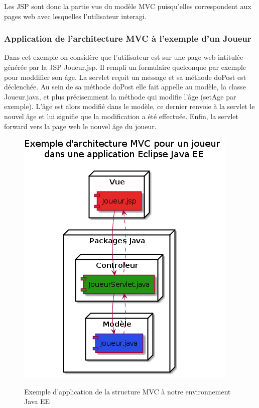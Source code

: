 Les JSP sont donc la partie vue du modèle MVC puisqu'elles correspondent aux pages web avec lesquelles l'utilisateur interagi.

\subsubsection{Application de l'architecture MVC à l'exemple d'un Joueur}
Dans cet exemple on considère que l'utilisateur est sur une page web intitulée générée par la JSP Joueur.jsp. Il rempli un formulaire quelconque par exemple pour moddifier son âge. La servlet reçoit un message et sa méthode doPost est déclenchée. Au sein de sa méthode doPost elle fait appelle au modèle, la classe Joueur.java, et plus précisemment la méthode qui modifie l'âge (setAge par exemple). L'âge est alors modifié dans le modèle, ce dernier renvoie à la servlet le nouvel âge et lui signifie que la modification a été effectuée. Enfin, la servlet forward vers la page web le nouvel âge du joueur.
\begin{figure}[H]
  \center
  \includegraphics[scale=0.6]{../graph/exempleMVC.png} \\
  \caption{Exemple d'application de la structure MVC à notre environnement Java EE}
\end{figure}
